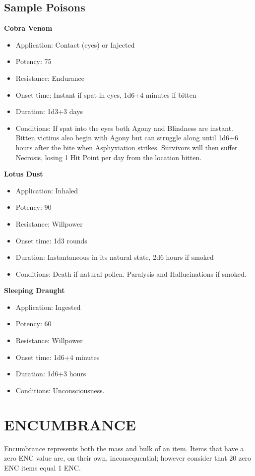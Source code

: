 \documentclass[10pt]{article}
\begin{document}
\subsection{Sample Poisons}
\label{sec:sample-poisons}
\textbf{Cobra Venom}
\begin{itemize}[leftmargin=*]
    \item Application: Contact (eyes) or Injected
    \item Potency: 75
    \item Resistance: Endurance
    \item Onset time: Instant if spat in eyes, 1d6+4 minutes if bitten
    \item Duration: 1d3+3 days
    \item Conditions: If spat into the eyes both Agony and Blindness are instant. Bitten victims also begin with Agony but can struggle along until 1d6+6 hours after the bite when Asphyxiation strikes. Survivors will then suffer Necrosis, losing 1 Hit Point per day from the location bitten.
\end{itemize}

\textbf{Lotus Dust}
\begin{itemize}[leftmargin=*]
    \item Application: Inhaled
    \item Potency: 90
    \item Resistance: Willpower
    \item Onset time: 1d3 rounds
    \item Duration: Instantaneous in its natural state, 2d6 hours if smoked
    \item Conditions: Death if natural pollen. Paralysis and Hallucinations if smoked.
\end{itemize}

\textbf{Sleeping Draught}
\begin{itemize}[leftmargin=*]
    \item Application: Ingested
    \item Potency: 60
    \item Resistance: Willpower
    \item Onset time: 1d6+4 minutes
    \item Duration: 1d6+3 hours
    \item Conditions: Unconsciousness.
\end{itemize}

\section{ENCUMBRANCE}
\label{sec:encumbrance}
Encumbrance represents both the mass and bulk of an item. Items that have a zero ENC value are, on their own, inconsequential; however consider that 20 zero ENC items equal 1 ENC.
\end{document}
